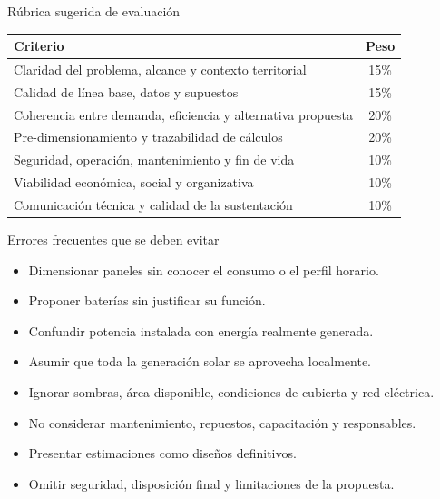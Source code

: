 \documentclass[aspectratio=169,10pt]{beamer}
\begin{document}
\begin{frame}{Rúbrica sugerida de evaluación}
\centering
\small
\begin{tabular}{p{} c}
\toprule
\textbf{Criterio} & \textbf{Peso} \\
\midrule
Claridad del problema, alcance y contexto territorial & 15\% \\
Calidad de línea base, datos y supuestos & 15\% \\
Coherencia entre demanda, eficiencia y alternativa propuesta & 20\% \\
Pre-dimensionamiento y trazabilidad de cálculos & 20\% \\
Seguridad, operación, mantenimiento y fin de vida & 10\% \\
Viabilidad económica, social y organizativa & 10\% \\
Comunicación técnica y calidad de la sustentación & 10\% \\
\bottomrule
\end{tabular}
\end{frame}

\begin{frame}{Errores frecuentes que se deben evitar}
\begin{itemize}
    \item Dimensionar paneles sin conocer el consumo o el perfil horario.
    \item Proponer baterías sin justificar su función.
    \item Confundir potencia instalada con energía realmente generada.
    \item Asumir que toda la generación solar se aprovecha localmente.
    \item Ignorar sombras, área disponible, condiciones de cubierta y red eléctrica.
    \item No considerar mantenimiento, repuestos, capacitación y responsables.
    \item Presentar estimaciones como diseños definitivos.
    \item Omitir seguridad, disposición final y limitaciones de la propuesta.
\end{itemize}
\end{frame}
\end{document}
